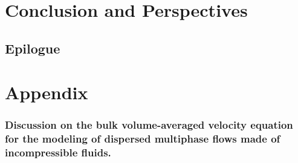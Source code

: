 \documentclass[12pt,a4paper,oneside,openany]{My_book}
\begin{document}


\part*{Conclusion and Perspectives}


\chapter*{Epilogue}




\appendix
\renewcommand{\thesection}{\Alph{section}}
\renewcommand{\thesubsection}{\Alph{section}.\arabic{subsection}}
\part*{Appendix}








% 
% 
% 
% 
% 
% 













\section{
Discussion on the bulk volume-averaged velocity equation for the modeling of dispersed multiphase flows made of incompressible fluids. 
}
\label{ap:momentum_formulation}




\end{document}
